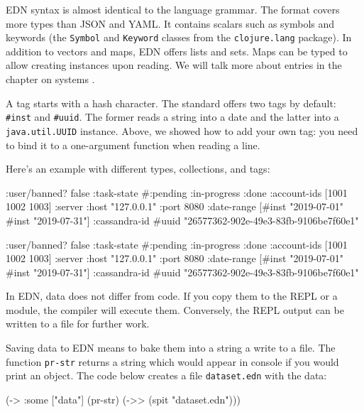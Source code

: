 EDN syntax is almost identical to the language grammar. The format covers more types than JSON and YAML. It contains scalars such as symbols and keywords (the \verb|Symbol| and \verb|Keyword| classes from the \verb|clojure.lang| package). In addition to vectors and maps, EDN offers lists and sets. Maps can be typed to allow creating  instances upon reading. We will talk more about entries in the chapter on systems .


A tag starts with a hash character. The standard offers two tags by default: \verb|#inst| and \verb|#uuid|. The former reads a string into a date and the latter into a \verb|java.util.UUID| instance. Above, we showed how to add your own tag: you need to bind it to a one-argument function when reading a line.

Here's an example with different types, collections, and tags:

\ifnarrow

\begin{clojure}
{:user/banned? false
 :task-state
 #{:pending :in-progress :done}
 :account-ids
 [1001 1002 1003]
 :server
 {:host "127.0.0.1" :port 8080}
 :date-range
 [#inst "2019-07-01" #inst "2019-07-31"]
 :cassandra-id #uuid
 "26577362-902e-49e3-83fb-9106be7f60e1"}
\end{clojure}

\else

\begin{clojure}
{:user/banned? false
 :task-state #{:pending :in-progress :done}
 :account-ids [1001 1002 1003]
 :server {:host "127.0.0.1" :port 8080}
 :date-range [#inst "2019-07-01" #inst "2019-07-31"]
 :cassandra-id #uuid "26577362-902e-49e3-83fb-9106be7f60e1"}
\end{clojure}

\fi

In EDN, data does not differ from code. If you copy them to the REPL or a module, the compiler will execute them. Conversely, the REPL output can be written to a file for further work.

Saving data to EDN means to bake them into a string a write to a file. The function \verb|pr-str| returns a string which would appear in console if you would print an object. The code below creates a file \verb|dataset.edn| with the data:

\begin{english}
  \begin{clojure}
(-> {:some ["data"]}
    (pr-str)
    (->> (spit "dataset.edn")))
  \end{clojure}
\end{english}

